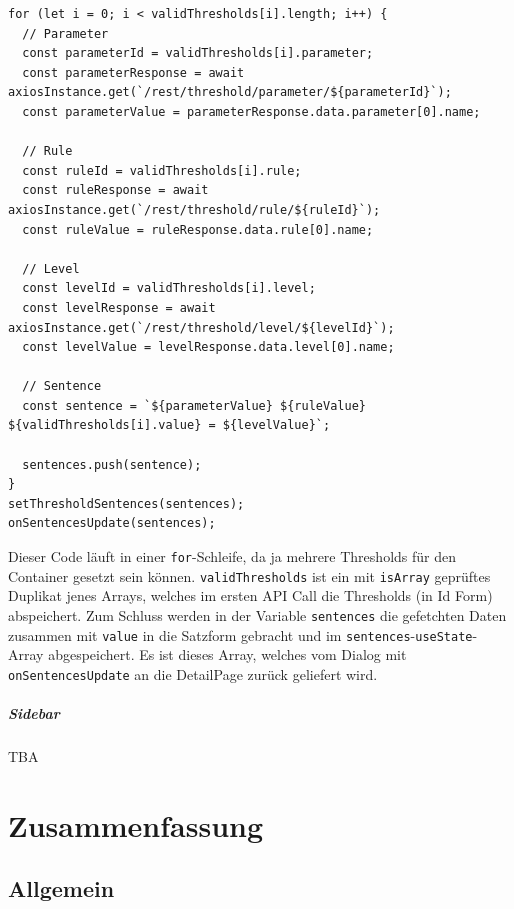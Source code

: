 \documentclass[
    headings=optiontotocandhead,%
    twoside,
    numbers=noenddot,%
    12pt, %
    titlepage, %
    parskip=full, %
    listof=leveldown, 
    numbers=noenddot, %
    a4paper,DIV=14,
    BCOR=15mm,
]{scrbook}
\makeatletter
\newcommand{\passthrough}[1]{#1}
\newcommand*{\the@orig@section}{}
\let\the@orig@section\section
\renewcommand*{\section}{%
  \clearpage
  \the@orig@section
}
\makeatother
\begin{document}
\begin{lstlisting}[caption={Fetchen von Namen der Threshold-Bestandteile mit ihrer Id}]
for (let i = 0; i < validThresholds[i].length; i++) {
  // Parameter
  const parameterId = validThresholds[i].parameter;
  const parameterResponse = await axiosInstance.get(`/rest/threshold/parameter/${parameterId}`);
  const parameterValue = parameterResponse.data.parameter[0].name;

  // Rule
  const ruleId = validThresholds[i].rule;
  const ruleResponse = await axiosInstance.get(`/rest/threshold/rule/${ruleId}`);
  const ruleValue = ruleResponse.data.rule[0].name;

  // Level
  const levelId = validThresholds[i].level;
  const levelResponse = await axiosInstance.get(`/rest/threshold/level/${levelId}`);
  const levelValue = levelResponse.data.level[0].name;

  // Sentence
  const sentence = `${parameterValue} ${ruleValue} ${validThresholds[i].value} = ${levelValue}`;
  
  sentences.push(sentence);
}
setThresholdSentences(sentences);
onSentencesUpdate(sentences);
\end{lstlisting}

Dieser Code läuft in einer \passthrough{\lstinline!for!}-Schleife, da ja
mehrere Thresholds für den Container gesetzt sein können.
\passthrough{\lstinline!validThresholds!} ist ein mit
\passthrough{\lstinline!isArray!} geprüftes Duplikat jenes Arrays,
welches im ersten API Call die Thresholds (in Id Form) abspeichert. Zum
Schluss werden in der Variable \passthrough{\lstinline!sentences!} die
gefetchten Daten zusammen mit \passthrough{\lstinline!value!} in die
Satzform gebracht und im
\passthrough{\lstinline!sentences!}-\passthrough{\lstinline!useState!}-Array
abgespeichert. Es ist dieses Array, welches vom Dialog mit
\passthrough{\lstinline!onSentencesUpdate!} an die DetailPage zurück
geliefert wird.

\hypertarget{sidebar-1}{%
\subparagraph{Sidebar}\label{sidebar-1}}

TBA

\hypertarget{zusammenfassung}{%
\section{Zusammenfassung}\label{zusammenfassung}}

\hypertarget{allgemein}{%
\subsection{Allgemein}\label{allgemein}}
\end{document}
